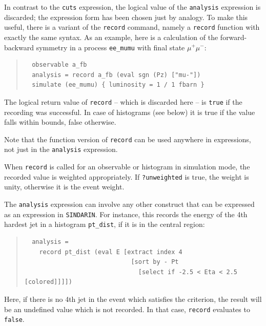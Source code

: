 \documentclass[12pt]{book}
\newcommand{\ttt}[1]{\texttt{#1}}
\newcommand{\sindarin}{\ttt{SINDARIN}}
\begin{document}
In contrast to the \ttt{cuts} expression, the logical value of the
\ttt{analysis} expression is discarded; the expression form has been chosen
just by analogy.  To make this useful, there is a variant of the \ttt{record}
command, namely a \ttt{record} function with exactly the same syntax.  As an
example, here is a calculation of the forward-backward symmetry in a process
\ttt{ee\_mumu} with final state $\mu^+\mu^-$:
\begin{quote}
  \begin{footnotesize}
\begin{verbatim}
  observable a_fb
  analysis = record a_fb (eval sgn (Pz) ["mu-"])
  simulate (ee_mumu) { luminosity = 1 / 1 fbarn }
\end{verbatim}
  \end{footnotesize}
\end{quote}
The logical return value of \ttt{record} -- which is discarded here -- is
\ttt{true} if the recording was successful.  In case of histograms (see below)
it is true if the value falls within bounds, false otherwise.

Note that the function version of \ttt{record} can be used anywhere in
expressions, not just in the \ttt{analysis} expression.

When \ttt{record} is called for an observable or histogram in simulation mode,
the recorded value is weighted appropriately.  If \ttt{?unweighted} is true,
the weight is unity, otherwise it is the event weight.

The \ttt{analysis} expression can involve any other construct
that can be expressed as an expression in \sindarin.  For instance, this
records the energy of the 4th hardest jet in a histogram \ttt{pt\_dist}, if it
is in the central region:
\begin{quote}
  \begin{footnotesize}
\begin{verbatim}
  analysis =
    record pt_dist (eval E [extract index 4
                             [sort by - Pt
                               [select if -2.5 < Eta < 2.5 [colored]]]])
\end{verbatim}
  \end{footnotesize}
\end{quote}
Here, if there is no 4th jet in the event which satisfies the criterion, the
result will be an undefined value which is not recorded.  In that case,
\ttt{record} evaluates to \ttt{false}.
\end{document}
